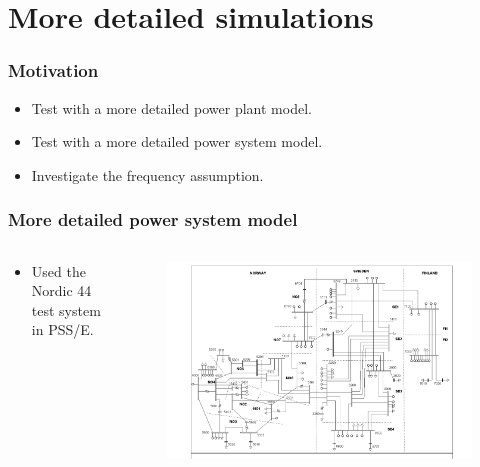 \section{More detailed simulations}
\begin{frame}
	\frametitle{Motivation}
	\begin{itemize}
		\item Test with a more detailed power plant model.
		\item Test with a more detailed power system model.
		\item Investigate the frequency assumption.
	\end{itemize}
\end{frame}
\begin{frame}
	\frametitle{More detailed power system model}
	\begin{columns}
		\begin{column}{0.5\textwidth}
			\begin{itemize}
				\item Used the Nordic 44 test system in PSS/E.
			\end{itemize}
		\end{column}
		\begin{column}{0.5\textwidth}
			\begin{figure}
				\includegraphics[width=\textwidth]{./pictures/Nordic44-Bilde}
			\end{figure}
		\end{column}
	\end{columns}
\end{frame}
